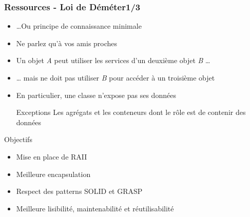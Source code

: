 \documentclass[C++.tex]{subfiles}
\begin{document}
\begin{frame}
	\frametitle{Ressources - Loi de Déméter\titlehfill{}1/3}


	\begin{itemize}
		\item \ldots Ou principe de connaissance minimale
		\item \og Ne parlez qu'à vos amis proches\fg{}
		\item Un objet \textit{A} peut utiliser les services d'un deuxième objet \textit{B} \ldots
		\item \ldots{} mais ne doit pas utiliser \textit{B} pour accéder à un troisième objet


		\item En particulier, une classe n'expose pas ses données

		\begin{block}{Exceptions}
			Les agrégats et les conteneurs dont le rôle est de contenir des données
		\end{block}
	\end{itemize}

	\begin{block}{Objectifs}
		\begin{itemize}
			\item Mise en place de RAII
			\item Meilleure encapsulation
			\item Respect des patterns SOLID et GRASP


			\item Meilleure lisibilité, maintenabilité et réutilisabilité
		\end{itemize}
	\end{block}
\end{frame}
\end{document}
